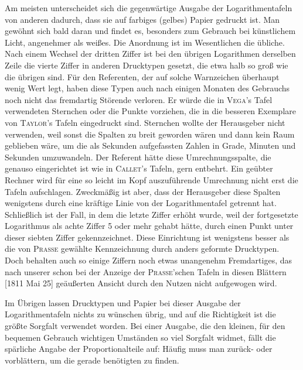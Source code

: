 Am meisten unterscheidet sich die gegenwärtige Ausgabe der Logarithmentafeln von anderen dadurch, dass sie auf farbiges (gelbes) Papier gedruckt ist. Man gewöhnt sich bald daran und findet es, besonders zum Gebrauch bei künstlichem Licht,  angenehmer als weißes. Die Anordnung ist im Wesentlichen die übliche. Nach einem Wechsel der dritten Ziffer ist bei den übrigen Logarithmen derselben Zeile die vierte Ziffer in anderen Drucktypen gesetzt, die etwa halb so groß wie die übrigen sind. Für den Referenten, der auf solche Warnzeichen überhaupt wenig Wert legt, haben diese Typen auch nach einigen Monaten des Gebrauchs noch nicht das fremdartig Störende verloren. Er würde die in \textsc{Vega}’s Tafel verwendeten Sternchen oder die Punkte vorziehen, die in die besseren Exemplare von \textsc{Taylor}’s Tafeln eingedruckt sind. Sternchen wollte der Herausgeber nicht verwenden, weil sonst die Spalten zu breit geworden wären und dann kein Raum geblieben wäre, um die als Sekunden aufgefassten Zahlen in Grade, Minuten und Sekunden umzuwandeln. Der Referent hätte diese Umrechnungsspalte, die genauso eingerichtet ist wie in \textsc{Callet}’s Tafeln, gern entbehrt. Ein geübter Rechner wird für eine so leicht im Kopf auszuführende Umrechnung nicht erst die Tafeln aufschlagen. Zweckmäßig ist aber, dass der Herausgeber diese Spalten wenigstens durch eine kräftige Linie von der Logarithmentafel getrennt hat. Schließlich ist der Fall, in dem die letzte Ziffer erhöht wurde, weil der fortgesetzte Logarithmus als achte Ziffer 5 oder mehr gehabt hätte, durch einen Punkt unter dieser siebten Ziffer gekennzeichnet. Diese Einrichtung ist wenigstens besser als die von \textsc{Prasse} gewählte Kennzeichnung durch anders geformte Drucktypen. Doch behalten auch so einige Ziffern noch etwas unangenehm Fremdartiges, das nach unserer schon bei der Anzeige der \textsc{Prasse}’schen Tafeln in diesen Blättern [1811 Mai 25] geäußerten Ansicht durch den Nutzen nicht aufgewogen wird.

Im Übrigen lassen Drucktypen und Papier bei dieser Ausgabe der Logarithmentafeln nichts zu wünschen übrig, und auf die Richtigkeit ist die größte Sorgfalt verwendet worden. Bei einer Ausgabe, die den kleinen, für den bequemen Gebrauch wichtigen Umständen so viel Sorgfalt widmet, fällt die spärliche Angabe der Proportionalteile auf: Häufig muss man zurück- oder vorblättern, um die gerade benötigten zu finden.
